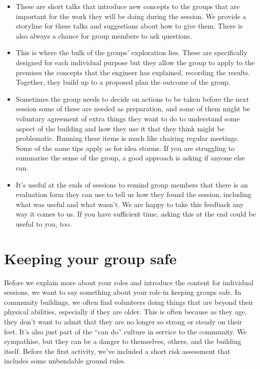 \documentclass[letterpaper,10pt,english]{jupyterBook}
\begin{document}
\begin{itemize}
\item {} 
\sphinxAtStartPar
{} These are short talks that introduce new concepts to the groups that are important for the work they will be doing during the session.  We provide a storyline for these talks and suggestions about how to give them.  There is also always a chance for group members to ask questions.

\item {} 
\sphinxAtStartPar
{} This is where the bulk of the groups’ exploration lies. These are specifically designed for each individual purpose but they allow the group to apply to the premises the concepts that the engineer has explained, recording the results.  Together, they build up to a proposed plan \sphinxhyphen{} the outcome of the group.

\item {} 
\sphinxAtStartPar
{} Sometimes the group needs to decide on actions to be taken before the next session \sphinxhyphen{} some of these are needed as preparation, and some of them might be voluntary agreement of extra things they want to do to understand some aspect of the building and how they use it that they think might be problematic. Running these items is much like chairing regular meetings.  Some of the same tips apply as for idea storms.  If you are struggling to summarise the sense of the group, a good approach is asking if anyone else can.

\item {} 
\sphinxAtStartPar
{} It’s useful at the ends of sessions to remind group members that there is an evaluation form they can use to tell us how they found the session, including what was useful and what wasn’t.  We are happy to take this feedback any way it comes to us.  If you have sufficient time, asking this at the end could be useful to you, too.

\end{itemize}

\sphinxstepscope


\chapter{Keeping your group safe}
\label{\detokenize{safety:keeping-your-group-safe}}\label{\detokenize{safety::doc}}
\sphinxAtStartPar
Before we explain more about your roles and introduce the content for individual sessions, we want to say something about your role in keeping groups safe.  In community buildings, we often find volunteers doing things that are beyond their physical abilities, especially if they are older.  This is often because as they age, they don’t want to admit that they are no longer so strong or steady on their feet.  It’s also just part of the “can do” culture in service to the community.  We sympathise, but they can be a danger to themselves, others, and the building itself.  Before the first activity, we’ve included a short risk assessment that includes some unbendable ground rules.
\end{document}
